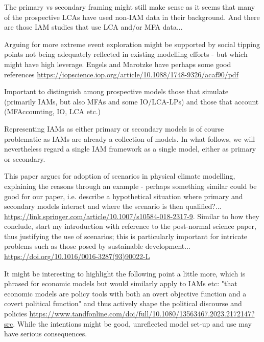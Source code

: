 \documentclass{article}
\begin{document}
The primary vs secondary framing might still make sense as it seems that many of the prospective LCAs have used non-IAM data in their background. And there are those IAM studies that use LCA and/or MFA data...

Arguing for more extreme event exploration might be supported by social tipping points not being adequately reflected in existing modelling efforts - but which might have high leverage. Engels and Marotzke have perhaps some good references \url{https://iopscience.iop.org/article/10.1088/1748-9326/acaf90/pdf}

Important to distinguish among prospective models those that simulate (primarily IAMs, but also MFAs and some IO/LCA-LPs) and those that account (MFAccounting, IO, LCA etc.)

Representing IAMs as either primary or secondary models is of course problematic as IAMs are already a collection of models. In what follows, we will nevertheless regard a single IAM framework as a single model, either as primary or secondary.

This paper argues for adoption of scenarios in physical climate modelling, explaining the reasons through an example - perhaps something similar could be good for our paper, i.e. describe a hypothetical situation where primary and secondary models interact and where the scenario is then qualified?... \url{https://link.springer.com/article/10.1007/s10584-018-2317-9}. Similar to how they conclude, start my introduction with reference to the post-normal science paper, thus justifying the use of scenarios; this is particularly important for intricate problems such as those posed by sustainable development... \url{https://doi.org/10.1016/0016-3287(93)90022-L}

It might be interesting to highlight the following point a little more, which is phrased for economic models but would similarly apply to IAMs etc: "that economic models are policy tools with both an overt objective function and a covert political function" and thus actively shape the political discourse and policies \url{https://www.tandfonline.com/doi/full/10.1080/13563467.2023.2172147?src}. While the intentions might be good, unreflected model set-up and use may have serious consequences.
\end{document}
